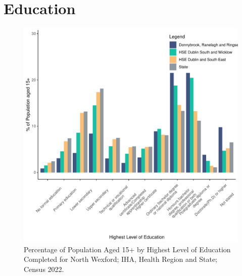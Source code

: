 \documentclass{article}
\begin{document}
\section{Education}\label{sect:Edu}
\begin{figure}[H]
	\centering
	\includegraphics[width = 120mm]{../figures/EduED.pdf}
	\caption{Percentage of Population Aged 15+ by Highest Level of Education Completed for North Wexford; IHA, Health Region and State; Census 2022.}
	\label{fig:vbnv}
	\end{figure}
\end{document}
